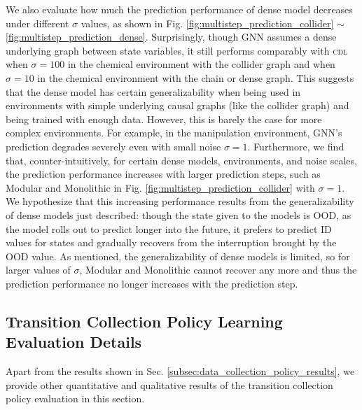 We also evaluate how much the prediction performance of dense model decreases under different $\sigma$ values, as shown in Fig. \ref{fig:multistep_prediction_collider} $\sim$ \ref{fig:multistep_prediction_dense}. Surprisingly, though GNN assumes a dense underlying graph between state variables, it still performs comparably with \textsc{cdl} when $\sigma=100$ in the chemical environment with the collider graph and when $\sigma=10$ in the chemical environment with the chain or dense graph. This suggests that the dense model has certain generalizability when being used in environments with simple underlying causal graphs (like the collider graph) and being trained with enough data. However, this is barely the case for more complex environments. For example, in the manipulation environment, GNN's prediction degrades severely even with small noise $\sigma=1$. Furthermore, we find that, counter-intuitively, for certain dense models, environments, and noise scales, the prediction performance increases with larger prediction steps, such as Modular and Monolithic in Fig. \ref{fig:multistep_prediction_collider} with $\sigma=1$. We hypothesize that this increasing performance results from the generalizability of dense models just described: though the state given to the models is OOD, as the model rolls out to predict longer into the future, it prefers to predict ID values for states and gradually recovers from the interruption brought by the OOD value. As mentioned, the generalizability of dense models is limited, so for larger values of $\sigma$, Modular and Monolithic cannot recover any more and thus the prediction performance no longer increases with the prediction step.

\subsection{Transition Collection Policy Learning Evaluation Details}
\label{app:data_collection_policy_results}

Apart from the results shown in Sec. \ref{subsec:data_collection_policy_results}, we provide other quantitative and qualitative results of the transition collection policy evaluation in this section.


